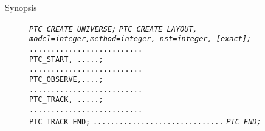 \begin{description}
	\item[Synopsis] \textit{
\texttt{PTC\_CREATE\_UNIVERSE;}}\textit{
\texttt{PTC\_CREATE\_LAYOUT, model=integer,method=integer, 
   nst=integer, [exact];}}
\texttt{..........................
\\PTC\_START, .....;
\\..........................
\\PTC\_OBSERVE,....;
\\..........................
\\PTC\_TRACK, .....;
\\..........................
\\PTC\_TRACK\_END;}
\texttt{..............................}\textit{
\texttt{PTC\_END; }}
\end{description}
